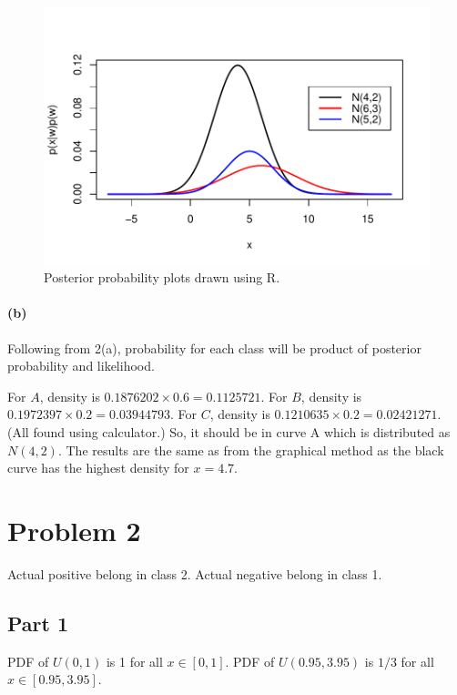 \documentclass{article}
\begin{document}
\begin{figure}[H]
	\centering
    \includegraphics[width=\textwidth]{Rplot01.pdf}
    \caption{Posterior probability plots drawn using R.}
    \label{fig:plot1}
\end{figure}

\paragraph{(b)}

Following from 2(a), probability for each class will be product of posterior probability and likelihood.

For $A$, density is $0.1876202 \times 0.6 = 0.1125721$. For $B$, density is $0.1972397 \times 0.2 = 0.03944793$. For $C$, density is $0.1210635 \times 0.2 = 0.02421271$. (All found using calculator.) So, it should be in curve A which is distributed as $N(4,2)$. The results are the same as from the graphical method as the black curve has the highest density for $x = 4.7$.


\section*{Problem 2}

Actual positive belong in class 2. Actual negative belong in class 1.

\subsection*{Part 1}

PDF of $U(0,1)$ is 1 for all $x \in [0,1]$. PDF of $U(0.95,3.95)$ is $1/3$ for all $x \in [0.95, 3.95]$.
\end{document}
